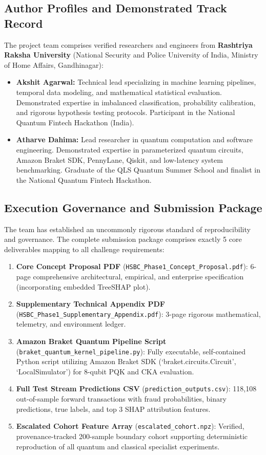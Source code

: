 \documentclass[10pt,a4paper]{article}
\begin{document}
\subsection{Author Profiles and Demonstrated Track Record}
The project team comprises verified researchers and engineers from \textbf{Rashtriya Raksha University} (National Security and Police University of India, Ministry of Home Affairs, Gandhinagar):
\begin{itemize}[leftmargin=*,itemsep=1.2pt,topsep=1pt]
\item \textbf{Akshit Agarwal:} Technical lead specializing in machine learning pipelines, temporal data modeling, and mathematical statistical evaluation. Demonstrated expertise in imbalanced classification, probability calibration, and rigorous hypothesis testing protocols. Participant in the National Quantum Fintech Hackathon (India).
\item \textbf{Atharve Dahima:} Lead researcher in quantum computation and software engineering. Demonstrated expertise in parameterized quantum circuits, Amazon Braket SDK, PennyLane, Qiskit, and low-latency system benchmarking. Graduate of the QLS Quantum Summer School and finalist in the National Quantum Fintech Hackathon.
\end{itemize}

\subsection{Execution Governance and Submission Package}
The team has established an uncommonly rigorous standard of reproducibility and governance. The complete submission package comprises exactly 5 core deliverables mapping to all challenge requirements:
\begin{enumerate}[leftmargin=*,itemsep=0.8pt,topsep=1pt]
\item \textbf{Core Concept Proposal PDF} (\texttt{HSBC\_Phase1\_Concept\_Proposal.pdf}): 6-page comprehensive architectural, empirical, and enterprise specification (incorporating embedded TreeSHAP plot).
\item \textbf{Supplementary Technical Appendix PDF} (\texttt{HSBC\_Phase1\_Supplementary\_Appendix.pdf}): 3-page rigorous mathematical, telemetry, and environment ledger.
\item \textbf{Amazon Braket Quantum Pipeline Script} (\texttt{braket\_quantum\_kernel\_pipeline.py}): Fully executable, self-contained Python script utilizing Amazon Braket SDK (`braket.circuits.Circuit', `LocalSimulator') for 8-qubit PQK and CKA evaluation.
\item \textbf{Full Test Stream Predictions CSV} (\texttt{prediction\_outputs.csv}): 118,108 out-of-sample forward transactions with fraud probabilities, binary predictions, true labels, and top 3 SHAP attribution features.
\item \textbf{Escalated Cohort Feature Array} (\texttt{escalated\_cohort.npz}): Verified, provenance-tracked 200-sample boundary cohort supporting deterministic reproduction of all quantum and classical specialist experiments.
\end{enumerate}
\end{document}
